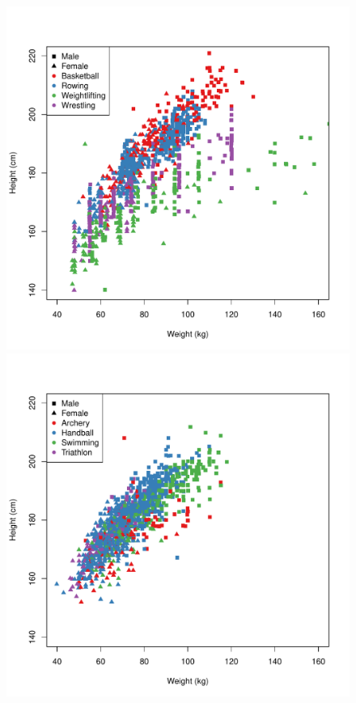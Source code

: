 \begin{center}
  \begin{figure}
    \begin{minipage}{0.2\textwidth}
      \begin{center}
        \includegraphics[scale=0.20]{../graphics/basketball.pdf}
      \end{center}
    \end{minipage}
    \hspace{0.05\textwidth}
    \begin{minipage}{0.2\textwidth}
      \begin{center}
        \includegraphics[scale=0.20]{../graphics/swimming.pdf}

\end{center}
\end{minipage}
\end{figure}
\end{center}
